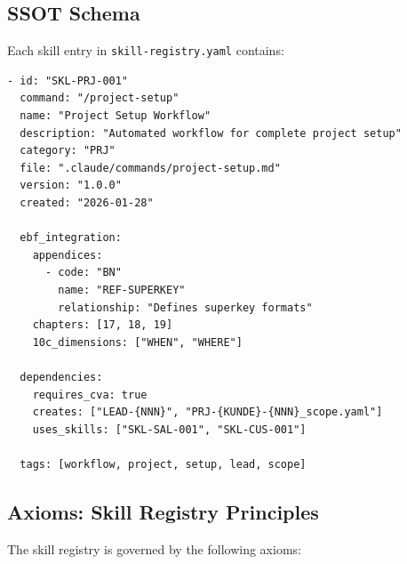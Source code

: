 \subsection{SSOT Schema}

Each skill entry in \texttt{skill-registry.yaml} contains:

\begin{verbatim}
- id: "SKL-PRJ-001"
  command: "/project-setup"
  name: "Project Setup Workflow"
  description: "Automated workflow for complete project setup"
  category: "PRJ"
  file: ".claude/commands/project-setup.md"
  version: "1.0.0"
  created: "2026-01-28"

  ebf_integration:
    appendices:
      - code: "BN"
        name: "REF-SUPERKEY"
        relationship: "Defines superkey formats"
    chapters: [17, 18, 19]
    10c_dimensions: ["WHEN", "WHERE"]

  dependencies:
    requires_cva: true
    creates: ["LEAD-{NNN}", "PRJ-{KUNDE}-{NNN}_scope.yaml"]
    uses_skills: ["SKL-SAL-001", "SKL-CUS-001"]

  tags: [workflow, project, setup, lead, scope]
\end{verbatim}


\subsection{Axioms: Skill Registry Principles}
\label{sec:sk-axioms}

The skill registry is governed by the following axioms:

